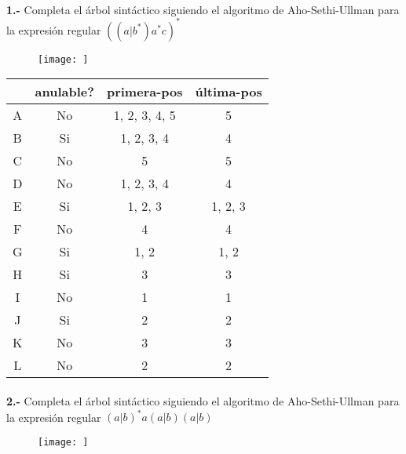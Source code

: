 \documentclass[11pt,a4paper]{report}
\begin{document}
\paragraph{}

\paragraph{}
\textbf{1.-} Completa el árbol sintáctico siguiendo el algoritmo de Aho-Sethi-Ullman para la expresión regular $ ((a|b^*)a^*c)^* $
\begin{figure}[ht!]
\centering
\texttt{[image: ]}
\end{figure}

\begin{tabular} {| c | c | c | c |}\hline
 & anulable? & primera-pos & última-pos\\ \hline
A & No & 1, 2, 3, 4, 5 & 5\\ \hline
B & Si & 1, 2, 3, 4 & 4\\ \hline
C & No & 5 & 5\\ \hline
D & No & 1, 2, 3, 4 & 4\\ \hline
E & Si & 1, 2, 3 & 1, 2, 3\\ \hline
F & No & 4 & 4\\ \hline
G & Si & 1, 2 & 1, 2\\ \hline
H & Si & 3 & 3\\ \hline
I & No & 1 & 1\\ \hline
J & Si & 2 & 2\\ \hline
K & No & 3 & 3\\ \hline
L & No & 2 & 2\\ \hline
\end{tabular}\paragraph{}
\textbf{2.-} Completa el árbol sintáctico siguiendo el algoritmo de Aho-Sethi-Ullman para la expresión regular $ (a|b)^*a(a|b)(a|b) $
\begin{figure}[ht!]
\centering
\texttt{[image: ]}
\end{figure}
\end{document}
